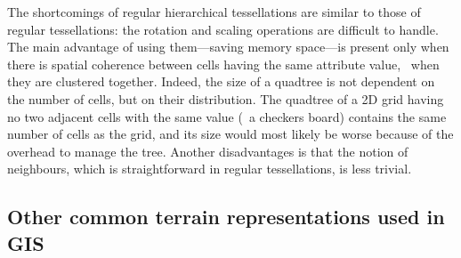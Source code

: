 %

The shortcomings of regular hierarchical tessellations are similar to those of regular tessellations: the rotation and scaling operations are difficult to handle.
The main advantage of using them---saving memory space---is present only when there is spatial coherence between cells having the same attribute value, \ie\ when they are clustered together.
Indeed, the size of a quadtree is not dependent on the number of cells, but on their distribution.
The quadtree of a 2D grid having no two adjacent cells with the same value (\eg\ a checkers board) contains the same number of cells as the grid, and its size would most likely be worse because of the overhead to manage the tree.
Another disadvantages is that the notion of neighbours, which is straightforward in regular tessellations, is less trivial.


\subsection{Other common terrain representations used in GIS}

